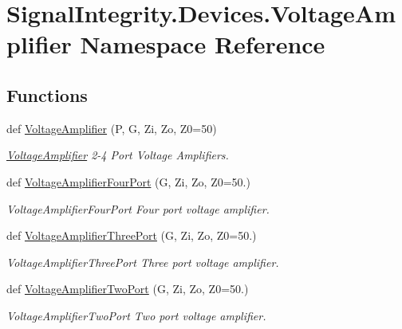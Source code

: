 \hypertarget{namespaceSignalIntegrity_1_1Devices_1_1VoltageAmplifier}{}\section{Signal\+Integrity.\+Devices.\+Voltage\+Amplifier Namespace Reference}
\label{namespaceSignalIntegrity_1_1Devices_1_1VoltageAmplifier}
\subsection*{Functions}
\begin{DoxyCompactItemize}
\item 
def \hyperlink{namespaceSignalIntegrity_1_1Devices_1_1VoltageAmplifier_ad9179e09f759aca4cdecba6b7dc8d6aa}{Voltage\+Amplifier} (P, G, Zi, Zo, Z0=50)
\begin{DoxyCompactList}\small\item\em \hyperlink{namespaceSignalIntegrity_1_1Devices_1_1VoltageAmplifier}{Voltage\+Amplifier} 2-\/4 Port Voltage Amplifiers. \end{DoxyCompactList}\item 
def \hyperlink{namespaceSignalIntegrity_1_1Devices_1_1VoltageAmplifier_aedb7edadaafea0c57173719f88a14e1c}{Voltage\+Amplifier\+Four\+Port} (G, Zi, Zo, Z0=50.)
\begin{DoxyCompactList}\small\item\em Voltage\+Amplifier\+Four\+Port Four port voltage amplifier. \end{DoxyCompactList}\item 
def \hyperlink{namespaceSignalIntegrity_1_1Devices_1_1VoltageAmplifier_a26928bad3e32832073e8175f4b006a7c}{Voltage\+Amplifier\+Three\+Port} (G, Zi, Zo, Z0=50.)
\begin{DoxyCompactList}\small\item\em Voltage\+Amplifier\+Three\+Port Three port voltage amplifier. \end{DoxyCompactList}\item 
def \hyperlink{namespaceSignalIntegrity_1_1Devices_1_1VoltageAmplifier_a420dc2939b209abb9da7940c3dbf4d2d}{Voltage\+Amplifier\+Two\+Port} (G, Zi, Zo, Z0=50.)
\begin{DoxyCompactList}\small\item\em Voltage\+Amplifier\+Two\+Port Two port voltage amplifier. \end{DoxyCompactList}\end{DoxyCompactItemize}


